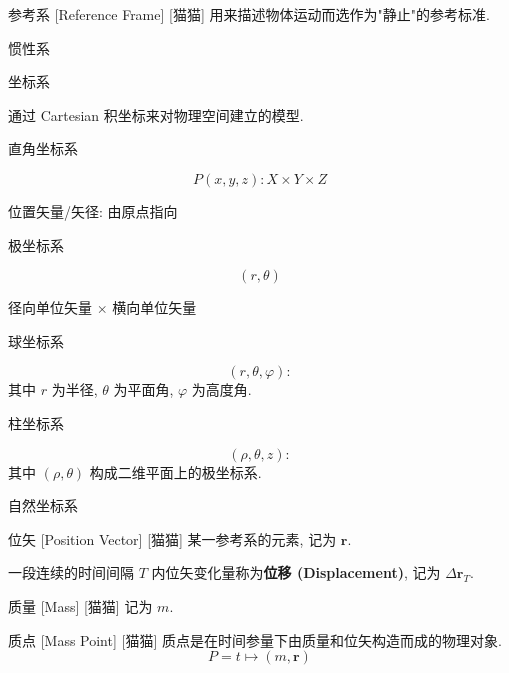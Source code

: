 \documentclass[UTF8]{ctexart}
\begin{document}
        \begin{dfn}
            []
            {参考系}
            [Reference Frame]
            [猫猫]
            用来描述物体运动而选作为"静止"的参考标准. 
        
            惯性系
        
            坐标系
        
                通过 Cartesian 积坐标来对物理空间建立的模型. 
        
                直角坐标系
        
                    $$P(x,y,z) : X\times Y\times Z$$
        
                    位置矢量/矢径: 由原点指向
        
                极坐标系
        
                    $$(r,\theta)$$
        
                    径向单位矢量 $\times$ 横向单位矢量
                
                球坐标系
        
                    $$(r,\theta,\varphi) : $$
                    其中 $r$ 为半径, $\theta$ 为平面角, $\varphi$ 为高度角. 
        
                柱坐标系
        
                    $$(\rho,\theta,z) : $$
                    其中 $(\rho,\theta)$ 构成二维平面上的极坐标系. 
        
                自然坐标系
        \end{dfn}
        
        \begin{dfn}
            []
            {位矢}
            [Position Vector]
            [猫猫]
            某一参考系的元素, 记为 \(\bm{r}\). 

            一段连续的时间间隔 \(T\) 内位矢变化量称为\textbf{位移 (Displacement)}, 记为 \(\Delta\bm{r}_T\). 
        \end{dfn}
        
        \begin{dfn}
            []
            {质量}
            [Mass]
            [猫猫]
            记为 \(m\). 
        \end{dfn}
        
        \begin{dfn}
            []
            {质点}
            [Mass Point]
            [猫猫]
            质点是在时间参量下由质量和位矢构造而成的物理对象. 
            \[P=t\mapsto(m,\bm{r})\]
        \end{dfn}
        
\end{document}
